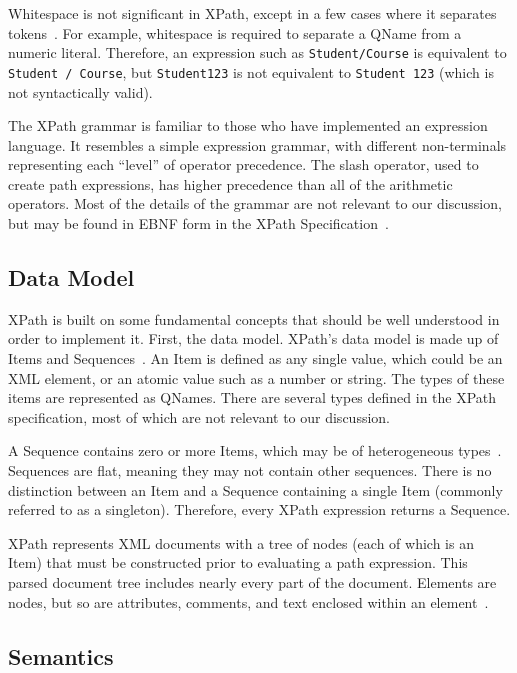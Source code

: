 \documentclass{article}
\begin{document}
Whitespace is not significant in XPath, except in a few cases where it separates
tokens~\cite{xpath}. For example, whitespace is required to separate a QName
from a numeric literal. Therefore, an expression such as \texttt{Student/Course}
is equivalent to \texttt{Student / Course}, but \texttt{Student123} is not
equivalent to \texttt{Student 123} (which is not syntactically valid).

The XPath grammar is familiar to those who have implemented an expression
language. It resembles a simple expression grammar, with different non-terminals
representing each ``level'' of operator precedence. The slash operator, used to
create path expressions, has higher precedence than all of the arithmetic
operators. Most of the details of the grammar are not relevant to our
discussion, but may be found in EBNF form in the XPath
Specification~\cite{xpath}.

\subsection{Data Model}

XPath is built on some fundamental concepts that should be well understood in
order to implement it. First, the data model. XPath's data model is made up of
Items and Sequences~\cite{xpath-datamodel}. An Item is defined as any single
value, which could be an XML element, or an atomic value such as a number or
string. The types of these items are represented as QNames. There are several
types defined in the XPath specification, most of which are not relevant to our
discussion.

A Sequence contains zero or more Items, which may be of heterogeneous
types~\cite{xpath-datamodel}. Sequences are flat, meaning they may not contain
other sequences. There is no distinction between an Item and a Sequence
containing a single Item (commonly referred to as a singleton). Therefore, every
XPath expression returns a Sequence.

XPath represents XML documents with a tree of nodes (each of which is an Item)
that must be constructed prior to evaluating a path expression. This parsed
document tree includes nearly every part of the document. Elements are nodes,
but so are attributes, comments, and text enclosed within an
element~\cite{xpath-datamodel}.

\subsection{Semantics}
\end{document}

